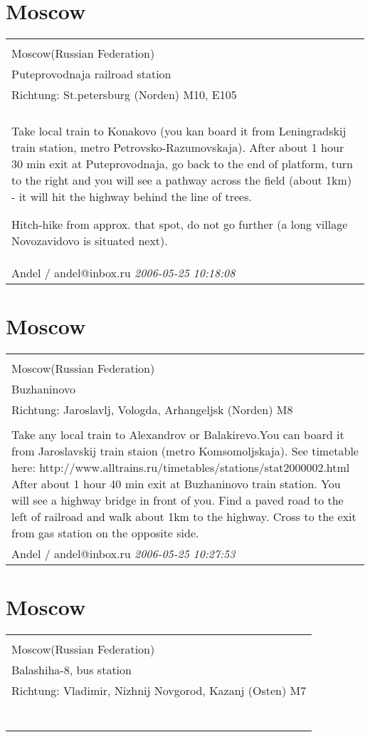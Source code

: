 \documentclass[a4paper,12pt]{article}
\begin{document}
\section{Moscow}
\begin{tabular}{|p{13cm}|}
\hline\\
Moscow(Russian Federation)\\
Puteprovodnaja railroad station\\
Richtung: St.petersburg (Norden) M10, E105 \\
\hline\\
Take local train to Konakovo (you kan board it from Leningradskij train station, metro Petrovsko-Razumovskaja). After about 1 hour 30 min exit at Puteprovodnaja, go back to the end of platform, turn to the right and you will see a pathway across the field (about 1km) - it will hit the highway behind the line of trees.

Hitch-hike from approx. that spot, do not go further (a long village Novozavidovo is situated next). \\
Andel / andel@inbox.ru \textit{ 2006-05-25 10:18:08 }\\\hline
\end{tabular}


\section{Moscow}
\begin{tabular}{|p{13cm}|}
\hline\\
Moscow(Russian Federation)\\
Buzhaninovo\\
Richtung: Jaroslavlj, Vologda, Arhangeljsk (Norden) M8 \\
\hline\\
Take any local train to Alexandrov or Balakirevo.You can board it from Jaroslavskij train staion (metro Komsomoljskaja). See timetable here:
http://www.alltrains.ru/timetables/stations/stat2000002.html
After about 1 hour 40 min exit at Buzhaninovo train station. You will see a highway bridge in front of you. Find a paved road to the left of railroad and walk about 1km to the highway. Cross to the exit from gas station on the opposite side. \\
Andel / andel@inbox.ru \textit{ 2006-05-25 10:27:53 }\\\hline
\end{tabular}


\section{Moscow}
\begin{tabular}{|p{13cm}|}
\hline\\
Moscow(Russian Federation)\\
Balashiha-8, bus station\\
Richtung: Vladimir, Nizhnij Novgorod, Kazanj (Osten) M7 \\
\hline\\
\\\
\end{tabular}
\end{document}
